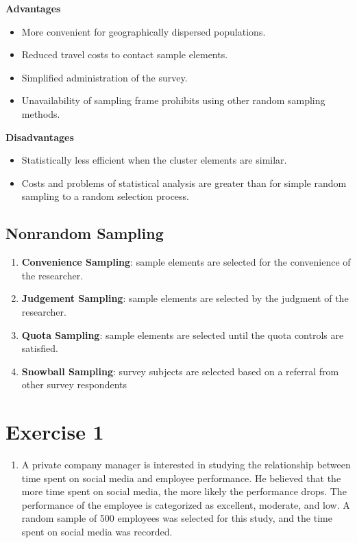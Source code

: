 \documentclass[
  a4paper,
  DIV=11,
  numbers=noendperiod,
  oneside]{scrreprt}
\providecommand{\tightlist}{%
  \setlength{\itemsep}{0pt}\setlength{\parskip}{0pt}}\usepackage{longtable,booktabs,array}
\begin{document}
\textbf{Advantages}

\begin{itemize}
\tightlist
\item
  More convenient for geographically dispersed populations.
\item
  Reduced travel costs to contact sample elements.
\item
  Simplified administration of the survey.
\item
  Unavailability of sampling frame prohibits using other random sampling
  methods.
\end{itemize}

\textbf{Disadvantages}

\begin{itemize}
\tightlist
\item
  Statistically less efficient when the cluster elements are similar.
\item
  Costs and problems of statistical analysis are greater than for simple
  random sampling to a random selection process.
\end{itemize}

\hypertarget{nonrandom-sampling}{%
\subsection{Nonrandom Sampling}\label{nonrandom-sampling}}

\begin{enumerate}
\def\labelenumi{\arabic{enumi}.}
\tightlist
\item
  \textbf{Convenience Sampling}: sample elements are selected for the
  convenience of the researcher.
\item
  \textbf{Judgement Sampling}: sample elements are selected by the
  judgment of the researcher.
\item
  \textbf{Quota Sampling}: sample elements are selected until the quota
  controls are satisfied.
\item
  \textbf{Snowball Sampling}: survey subjects are selected based on a
  referral from other survey respondents
\end{enumerate}

\hypertarget{exercise-1}{%
\section{Exercise 1}\label{exercise-1}}

\begin{enumerate}
\def\labelenumi{\arabic{enumi}.}
\tightlist
\item
  A private company manager is interested in studying the relationship
  between time spent on social media and employee performance. He
  believed that the more time spent on social media, the more likely the
  performance drops. The performance of the employee is categorized as
  excellent, moderate, and low. A random sample of 500 employees was
  selected for this study, and the time spent on social media was
  recorded.
\end{enumerate}
\end{document}
